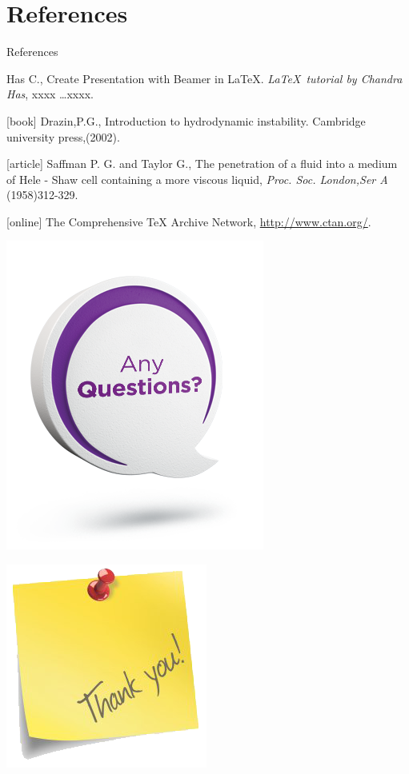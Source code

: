 \documentclass[12pt]{beamer}
\begin{document}
\section{References}
\begin{frame}{References}

\begin{thebibliography}{}
 Has C.,  Create Presentation with Beamer in \LaTeX. \emph{\LaTeX \ tutorial by Chandra Has}, xxxx \ldots xxxx.

[book]
 Drazin,P.G., Introduction to hydrodynamic instability. Cambridge university press,(2002).

[article]
 Saffman P. G. and Taylor G., The penetration of a fluid into a medium of Hele - Shaw cell containing a more viscous liquid, \emph{Proc. Soc. London,Ser A} (1958)312-329.

[online]
 The Comprehensive TeX Archive Network, \url{http://www.ctan.org/}.

\end{thebibliography}
\end{frame}


\begin{frame}
\centering
\includegraphics[scale=.7]{any_questions.png} 
\end{frame}

\begin{frame}
\centering
\includegraphics[scale=.7, angle=30]{thankyoupostit.png} 
\end{frame}
\end{document}
